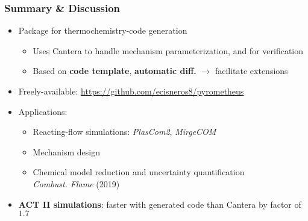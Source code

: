 \documentclass{beamer}
\begin{document}

\begin{frame}\frametitle{Summary \& Discussion}

  \begin{itemize}
  \item Package for thermochemistry-code generation
    \begin{itemize}
    \item Uses Cantera to handle mechanism parameterization, and for verification
    \item Based on \textbf{code template}, \textbf{automatic diff.} $\rightarrow$ facilitate extensions
    \end{itemize}
  \item Freely-available: \url{https://github.com/ecisneros8/pyrometheus}
  \end{itemize}

  \begin{itemize}
  \item Applications:
    \begin{itemize}
    \item Reacting-flow simulations: \textit{PlasCom2}, \textit{MirgeCOM}
    \item Mechanism design
    \item Chemical model reduction and uncertainty quantification\\
      \tiny{ \textit{Combust. Flame} (2019)}
    \end{itemize}
  \end{itemize}

  \begin{itemize}
  \item \textbf{ACT II simulations}: faster with generated code than Cantera by factor of $1.7$
  \end{itemize}
  
\end{frame}
\end{document}

